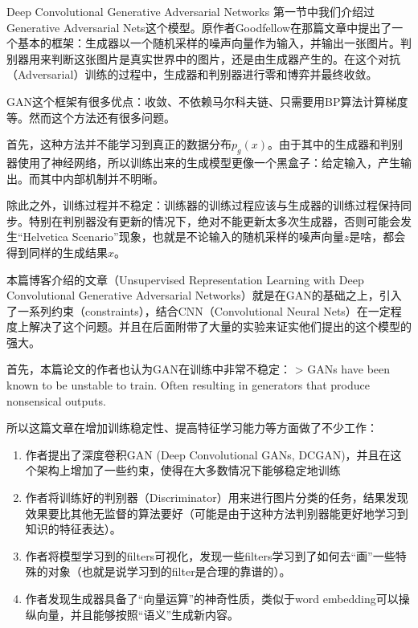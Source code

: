 \documentclass{ctexart}
\begin{document}
	\begin{section}{Deep Convolutional Generative Adversarial Networks}
		第一节中我们介绍过Generative Adversarial Nets这个模型。原作者Goodfellow在那篇文章\cite{goodfellow2014generative}中提出了一个基本的框架：生成器以一个随机采样的噪声向量作为输入，并输出一张图片。判别器用来判断这张图片是真实世界中的图片，还是由生成器产生的。在这个对抗（Adversarial）训练的过程中，生成器和判别器进行零和博弈并最终收敛。
		
		GAN这个框架有很多优点：收敛、不依赖马尔科夫链、只需要用BP算法计算梯度等。然而这个方法还有很多问题。
		
		首先，这种方法并不能学习到真正的数据分布$p_g(x)$。由于其中的生成器和判别器使用了神经网络，所以训练出来的生成模型更像一个黑盒子：给定输入，产生输出。而其中内部机制并不明晰。
		
		除此之外，训练过程并不稳定：训练器的训练过程应该与生成器的训练过程保持同步。特别在判别器没有更新的情况下，绝对不能更新太多次生成器，否则可能会发生“Helvetica Scenario”现象，也就是不论输入的随机采样的噪声向量$z$是啥，都会得到同样的生成结果$x$。
		
		本篇博客介绍的文章（Unsupervised Representation Learning with Deep Convolutional Generative Adversarial Networks\cite{radford2015unsupervised}）就是在GAN的基础之上，引入了一系列约束（constraints），结合CNN（Convolutional Neural Nets）在一定程度上解决了这个问题。并且在后面附带了大量的实验来证实他们提出的这个模型的强大。
		
		首先，本篇论文的作者也认为GAN在训练中非常不稳定：
		> GANs have been known to be unstable to train. Often resulting in generators that produce nonsensical outputs.
		
		所以这篇文章在增加训练稳定性、提高特征学习能力等方面做了不少工作：
		
		\begin{enumerate}
			\item 作者提出了深度卷积GAN (Deep Convolutional GANs, DCGAN)，并且在这个架构上增加了一些约束，使得在大多数情况下能够稳定地训练
			\item 作者将训练好的判别器（Discriminator）用来进行图片分类的任务，结果发现效果要比其他无监督的算法要好（可能是由于这种方法判别器能更好地学习到知识的特征表达）。
   			\item 作者将模型学习到的filters可视化，发现一些filters学习到了如何去“画”一些特殊的对象（也就是说学习到的filter是合理的靠谱的）。
			\item 作者发现生成器具备了“向量运算”的神奇性质，类似于word embedding可以操纵向量，并且能够按照“语义”生成新内容。
		\end{enumerate}
	

\end{section}
\end{document}
